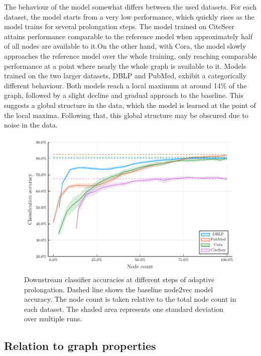The behaviour of the model somewhat differs between the used datasets. For each dataset, the model starts from a very low performance, which quickly rises as the model trains for several prolongation steps. The model trained on CiteSeer attains performance comparable to the reference model when approximately half of all nodes are available to it.On the other hand, with Cora, the model slowly approaches the reference model over the whole training, only reaching comparable performance at a point where nearly the whole graph is available to it. Models trained on the two larger datasets, DBLP and PubMed, exhibit a categorically different behaviour. Both models reach a local maximum at around 14\% of the graph, followed by a slight decline and gradual approach to the baseline. This suggests a global structure in the data, which the model is learned at the point of the local maxima. Following that, this global structure may be obscured due to noise in the data.


\begin{figure}
  \centering
  \includegraphics[width = \linewidth]{images/adaptive-coarsening/adaptive-coarsening.pdf}
  \caption{Downstream classifier accuracies at different steps of adaptive prolongation. Dashed line shows the baseline node2vec model accuracy. The node count is taken relative to the total node count in each dataset. The shaded area represents one standard deviation over multiple runs.}
  \label{fig:adaptive-coarsening}
\end{figure}

\subsection{Relation to graph properties}

